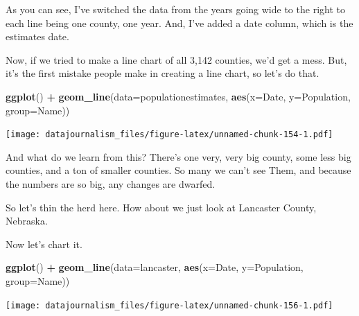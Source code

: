 \documentclass[]{book}
\newenvironment{Shaded}{\begin{snugshade}}{\end{snugshade}}
\newcommand{\DataTypeTok}[1]{\textcolor[rgb]{0.13,0.29,0.53}{#1}}
\newcommand{\KeywordTok}[1]{\textcolor[rgb]{0.13,0.29,0.53}{\textbf{#1}}}
\newcommand{\NormalTok}[1]{#1}
\newcommand{\OperatorTok}[1]{\textcolor[rgb]{0.81,0.36,0.00}{\textbf{#1}}}
\newcommand{\StringTok}[1]{\textcolor[rgb]{0.31,0.60,0.02}{#1}}
\begin{document}
As you can see, I've switched the data from the years going wide to the right to each line being one county, one year. And, I've added a date column, which is the estimates date.

Now, if we tried to make a line chart of all 3,142 counties, we'd get a mess. But, it's the first mistake people make in creating a line chart, so let's do that.

\begin{Shaded}
\begin{Highlighting}[]
\KeywordTok{ggplot}\NormalTok{() }\OperatorTok{+}\StringTok{ }\KeywordTok{geom_line}\NormalTok{(}\DataTypeTok{data=}\NormalTok{populationestimates, }\KeywordTok{aes}\NormalTok{(}\DataTypeTok{x=}\NormalTok{Date, }\DataTypeTok{y=}\NormalTok{Population, }\DataTypeTok{group=}\NormalTok{Name))}
\end{Highlighting}
\end{Shaded}

\texttt{[image: datajournalism\_files/figure-latex/unnamed-chunk-154-1.pdf]}

And what do we learn from this? There's one very, very big county, some less big counties, and a ton of smaller counties. So many we can't see Them, and because the numbers are so big, any changes are dwarfed.

So let's thin the herd here. How about we just look at Lancaster County, Nebraska.

\begin{Shaded}
\end{Shaded}

Now let's chart it.

\begin{Shaded}
\begin{Highlighting}[]
\KeywordTok{ggplot}\NormalTok{() }\OperatorTok{+}\StringTok{ }\KeywordTok{geom_line}\NormalTok{(}\DataTypeTok{data=}\NormalTok{lancaster, }\KeywordTok{aes}\NormalTok{(}\DataTypeTok{x=}\NormalTok{Date, }\DataTypeTok{y=}\NormalTok{Population, }\DataTypeTok{group=}\NormalTok{Name))}
\end{Highlighting}
\end{Shaded}

\texttt{[image: datajournalism\_files/figure-latex/unnamed-chunk-156-1.pdf]}
\end{document}

